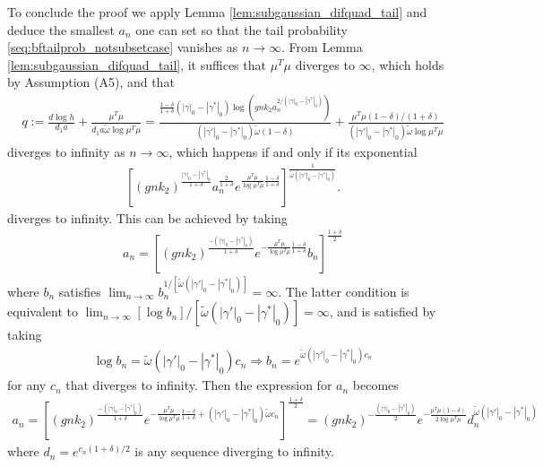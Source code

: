 To conclude the proof we apply Lemma \ref{lem:subgaussian_difquad_tail} and deduce the smallest $a_n$ one can set so that the tail probability \eqref{seq:bftailprob_notsubsetcase} vanishes as $n \rightarrow \infty$.
From Lemma \ref{lem:subgaussian_difquad_tail}, it suffices that $\mu^T \mu$ diverges to $\infty$, which holds by Assumption (A5), and that
\begin{align}
q:= \frac{d \log h}{d_1 a} + \frac{\mu^T\mu}{d_1 a \tilde{\omega} \log \mu^T\mu}
= \frac{\frac{1-\delta}{1+\delta}(|\gamma|_0-|\gamma^*|_0) \log \left( gnk_2 a_n^{2/(|\gamma|_0-|\gamma^*|_0)} \right)}{(|\gamma'|_0-|\gamma^*|_0) \tilde{\omega} (1-\delta)} + \frac{\mu^T\mu (1-\delta)/(1+\delta)}{(|\gamma'|_0-|\gamma^*|_0) \tilde{\omega} \log \mu^T\mu}
\nonumber
\end{align}
diverges to infinity as $n \rightarrow \infty$, which happens if and only if its exponential
\begin{align}
\left[ \left( gnk_2 \right)^{\frac{|\gamma|_0 - |\gamma^*|_0}{1+\delta}} a_n^{\frac{2}{1+\delta}} 
 e^{\frac{\mu^T\mu}{\log \mu^T\mu} \frac{1-\delta}{1+\delta}} \right]^{\frac{1}{\tilde{\omega}(|\gamma'|_0-|\gamma^*|_0)}}.
\nonumber
\end{align}
diverges to infinity. This can be achieved by taking
\begin{align}
 a_n= \left[ \left( gnk_2 \right)^{\frac{-(|\gamma|_0 - |\gamma^*|_0)}{1+\delta}} e^{-\frac{\mu^T\mu}{\log \mu^T\mu} \frac{1-\delta}{1+\delta}} b_n  \right]^{\frac{1+\delta}{2}}
\nonumber
\end{align}
where $b_n$ satisfies $\lim_{n \rightarrow \infty} b_n^{1/[\tilde{\omega}(|\gamma'|_0-|\gamma^*|_0)]}= \infty$.
The latter condition is equivalent to $\lim_{n \rightarrow \infty} [\log b_n]/[\tilde{\omega}(|\gamma'|_0-|\gamma^*|_0)] = \infty$, and is satisfied by taking
\begin{align}
 \log b_n= \tilde{\omega} (|\gamma'|_0 - |\gamma^*|_0) c_n \Longrightarrow b_n= e^{\tilde{\omega} (|\gamma'|_0 - |\gamma^*|_0) c_n}
\nonumber
\end{align}
for any $c_n$ that diverges to infinity. Then the expression for $a_n$ becomes
\begin{align}
 a_n= \left[ \left( gnk_2 \right)^{\frac{-(|\gamma|_0 - |\gamma^*|_0)}{1+\delta}} e^{-\frac{\mu^T\mu}{\log \mu^T\mu} \frac{1-\delta}{1+\delta} + (|\gamma'|_0 - |\gamma^*|_0) \tilde{\omega} c_n}  \right]^{\frac{1+\delta}{2}} 
= \left( gnk_2 \right)^{-\frac{(|\gamma|_0-|\gamma^*|_0)}{2}}
e^{-\frac{\mu^T\mu (1-\delta)}{2 \log \mu^T\mu}} d_n^{\tilde{\omega} (|\gamma'|_0-|\gamma^*|_0)}
\nonumber
\end{align}
where $d_n= e^{c_n (1+\delta)/2}$ is any sequence diverging to infinity.


